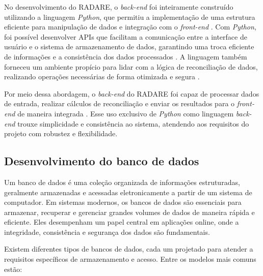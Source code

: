 No desenvolvimento do RADARE, o \textit{back-end} foi inteiramente construído utilizando a linguagem \textit{Python}, que permitiu a implementação de uma estrutura eficiente para manipulação de dados e integração com o \textit{front-end} \cite{pythonweb}. Com \textit{Python}, foi possível desenvolver APIs que facilitam a comunicação entre a interface de usuário e o sistema de armazenamento de dados, garantindo uma troca eficiente de informações e a consistência dos dados processados \cite{pythonapi}. A linguagem também forneceu um ambiente propício para lidar com a lógica de reconciliação de dados, realizando operações necessárias de forma otimizada e segura \cite{pythondata}.

Por meio dessa abordagem, o \textit{back-end} do RADARE foi capaz de processar dados de entrada, realizar cálculos de reconciliação e enviar os resultados para o \textit{front-end} de maneira integrada \cite{backendworkflow}. Esse uso exclusivo de \textit{Python} como linguagem \textit{back-end} trouxe simplicidade e consistência ao sistema, atendendo aos requisitos do projeto com robustez e flexibilidade.


\subsection{Desenvolvimento do banco de dados}

Um banco de dados é uma coleção organizada de informações estruturadas, geralmente armazenadas e acessadas eletronicamente a partir de um sistema de computador. Em sistemas modernos, os bancos de dados são essenciais para armazenar, recuperar e gerenciar grandes volumes de dados de maneira rápida e eficiente. Eles desempenham um papel central em aplicações online, onde a integridade, consistência e segurança dos dados são fundamentais.

Existem diferentes tipos de bancos de dados, cada um projetado para atender a requisitos específicos de armazenamento e acesso. Entre os modelos mais comuns estão:

